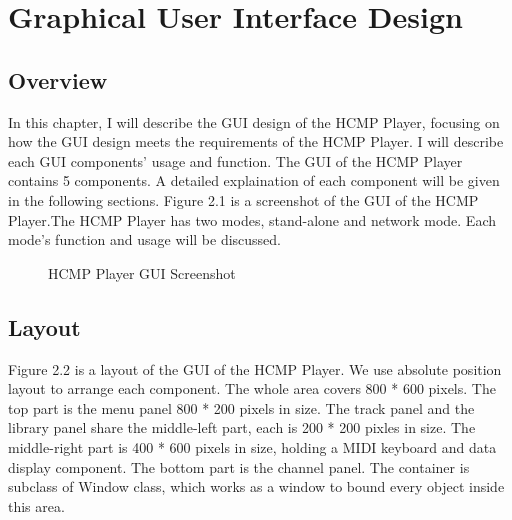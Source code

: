 
\chapter{Graphical User Interface Design} %

\section{Overview}
In this chapter, I will describe the GUI design of the HCMP Player, focusing 
on how the GUI design meets the requirements of the HCMP Player. I will describe
each GUI components' 
usage and function. The GUI of the HCMP Player contains 5 components.
A detailed explaination of each component will be given in the following sections. 
Figure 2.1 is a screenshot of the GUI of the HCMP Player.The HCMP Player has 
two modes, 
stand-alone and network mode. Each mode's function and usage will be discussed.

\begin{figure}[H]
\caption{HCMP Player GUI Screenshot}
\label{fig:speciation}
\end{figure}

\section{Layout}
Figure 2.2 is a layout of the GUI of the HCMP Player. We use absolute position layout 
to arrange each component. The whole area 
covers 800 * 600 pixels. The top part is the menu panel 800 * 200 pixels 
in size. The track panel and 
the library panel share the middle-left part, each is 200 * 200 pixles in size. 
The middle-right part is 400 * 600 pixels in size, holding a MIDI keyboard and data 
display component. The bottom part is the channel panel. The container is subclass of
Window class, which works as a window to bound every object inside this area. 

